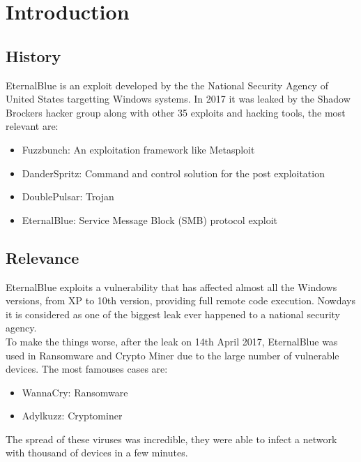 \section{Introduction}
\subsection{History}
EternalBlue is an exploit developed by the the National Security Agency of United States targetting Windows systems\cite{nsa-hacked}.
In 2017 it was leaked by the Shadow Brockers hacker group along with other 35 exploits and hacking
tools, the most relevant are:
\begin{itemize}
    \item Fuzzbunch: An exploitation framework like Metasploit
    \item DanderSpritz: Command and control solution for the post exploitation
    \item DoublePulsar: Trojan
    \item EternalBlue: Service Message Block (SMB) protocol exploit
\end{itemize}

\subsection{Relevance}
EternalBlue exploits a vulnerability that has affected almost all the Windows versions, from XP to 10th version, providing full remote code execution\cite{microsoft-bulletin}.
Nowdays it is considered as one of the biggest leak ever happened to a national security agency.\\
To make the things worse, after the leak on 14th April 2017, EternalBlue was used in Ransomware\cite{exploit-wannacryptor} and Crypto Miner due to the large number of vulnerable devices.
The most famouses cases are:
\begin{itemize}
    \item WannaCry: Ransomware
    \item Adylkuzz: Cryptominer
\end{itemize}
The spread of these viruses was incredible, they were able to infect a network with thousand of devices in a few minutes.